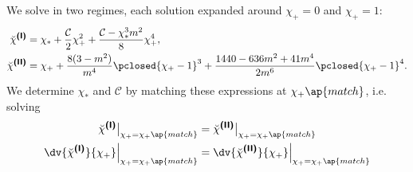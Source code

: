 We solve in two regimes, each solution expanded around  $\chi_+=0$ and  $\chi_+=1$:
\begin{subequations}
    \begin{align}
        \brchi^{\text{\eqregimenum{I}}}  &= \chi_\ast + \frac{\mathcal{C}}{2}\chi_+^2 + \frac{\mathcal{C}-\chi_\ast^3 m^2}{8} \chi_+^4 ,\\ %
        \brchi^{\text{\eqregimenum{II}}} &= \chi_+ + \frac{8(3-m^2)}{m^4} \pclosed{\chi_+ -1}^3 + \frac{1440 - 636m^2 + 41m^4}{2m^6} \pclosed{\chi_+ -1}^4. %
    \end{align}
\end{subequations}
We determine $\chi_\ast$ and $\mathcal{C}$ by matching these expressions at $\chi_+\ap{match}$, 
i.e. solving
\begin{equation}
    \begin{split}
        \brchi^{\text{\eqregimenum{I}}}\big|_{\chi_+=\chi_+\ap{match}} &= \brchi^{\text{\eqregimenum{II}}}\big|_{\chi_+=\chi_+\ap{match}} \\
        \dv{\brchi^{\text{\eqregimenum{I}}}}{\chi_+}\Big|_{\chi_+=\chi_+\ap{match}} &= \dv{\brchi^{\text{\eqregimenum{II}}}}{\chi_+}\Big|_{\chi_+=\chi_+\ap{match}}
    \end{split}
\end{equation}

